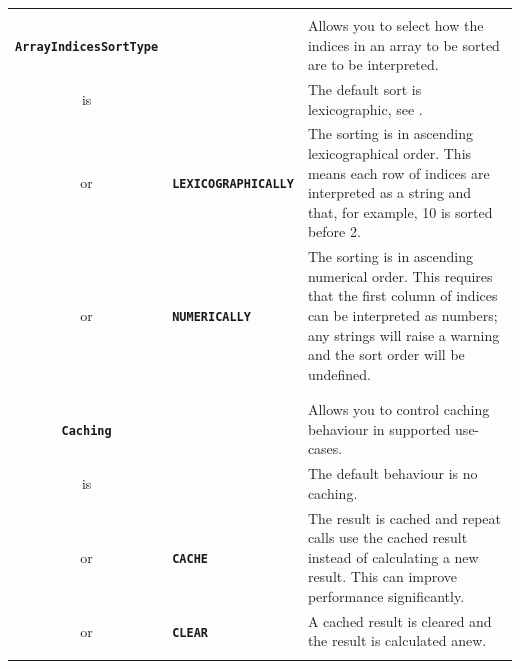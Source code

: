 \documentclass{article}
\def\ttref#1{\ahrefloc{#1}{\tt #1}}
\def\DEFINE#1{{\tt \bf #1}\label{#1}\index{#1}}
\def\t#1{{\tt #1}}
\begin{document}
\begin{tabular}{cp{10in}|p{10in}}
\\

\\

\DEFINE{ArrayIndicesSortType} && Allows you to select how the indices
in an array to be sorted are to be interpreted. \\

is && The default sort is lexicographic, see \ttref{LEXICOGRAPHICALLY}.\\

or & \DEFINE{LEXICOGRAPHICALLY} & The sorting is in ascending
lexicographical order. This means each row of indices are interpreted
as a string and that, for example, 10 is sorted before 2.\\

or & \DEFINE{NUMERICALLY} & The sorting is in ascending numerical
order. This requires that the first column of indices can be
interpreted as numbers; any strings will raise a warning and the sort
order will be undefined. \\

\\
\\

\DEFINE{Caching} && Allows you to control caching behaviour in
supported use-cases. \\

is && The default behaviour is no caching. \\

or & \t{\textbf{CACHE}} & The result is cached and repeat calls use the
cached result instead of calculating a new result. This can improve
performance significantly. \\

or & \t{\textbf{CLEAR}} & A cached result is cleared and the result is
calculated anew. \\

\\


\end{tabular}
\end{document}
